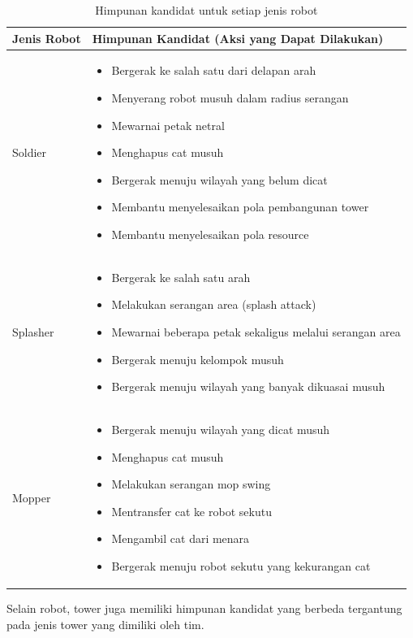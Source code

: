 \documentclass{article}
\begin{document}
\begin{table}[H]
\centering
\begin{tabular}{|p{3cm}|p{11cm}|}
\hline
\textbf{Jenis Robot} & \textbf{Himpunan Kandidat (Aksi yang Dapat Dilakukan)} \\
\hline
Soldier &
\begin{itemize}
\item Bergerak ke salah satu dari delapan arah
\item Menyerang robot musuh dalam radius serangan
\item Mewarnai petak netral
\item Menghapus cat musuh
\item Bergerak menuju wilayah yang belum dicat
\item Membantu menyelesaikan pola pembangunan tower
\item Membantu menyelesaikan pola resource
\end{itemize}
\\
\hline
Splasher &
\begin{itemize}
\item Bergerak ke salah satu arah
\item Melakukan serangan area (splash attack)
\item Mewarnai beberapa petak sekaligus melalui serangan area
\item Bergerak menuju kelompok musuh
\item Bergerak menuju wilayah yang banyak dikuasai musuh
\end{itemize}
\\
\hline
Mopper &
\begin{itemize}
\item Bergerak menuju wilayah yang dicat musuh
\item Menghapus cat musuh
\item Melakukan serangan mop swing
\item Mentransfer cat ke robot sekutu
\item Mengambil cat dari menara
\item Bergerak menuju robot sekutu yang kekurangan cat
\end{itemize}
\\
\hline
\end{tabular}
\caption{Himpunan kandidat untuk setiap jenis robot}
\end{table}

Selain robot, tower juga memiliki himpunan kandidat yang berbeda tergantung pada jenis tower yang dimiliki oleh tim.
\end{document}
